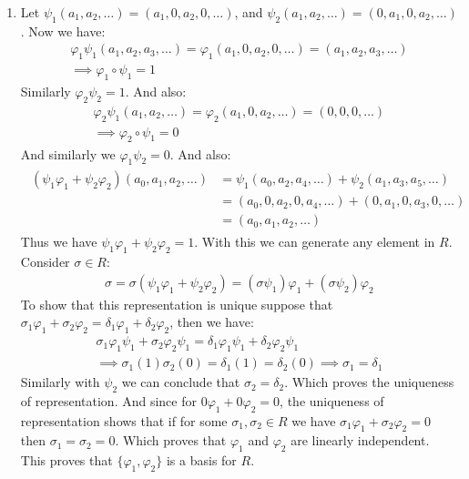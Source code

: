 \begin{enumerate}[label=\ilabel]
    \item 
        Let $\psi_1(a_1, a_2, \dots) = (a_1, 0, a_2, 0, \dots)$, and $\psi_2(a_1, a_2, \dots) = (0, a_1, 0, a_2, \dots)$. Now we have:
        \begin{gather*}
            \varphi_1 \psi_1 (a_1, a_2, a_3, \dots) = \varphi_1(a_1, 0, a_2, 0, \dots) = (a_1, a_2, a_3, \dots) \\
            \implies \varphi_1 \circ \psi_1 = 1
        \end{gather*}
        Similarly $\varphi_2 \psi_2 = 1$. And also:
        \begin{gather*}
            \varphi_2 \psi_1(a_1, a_2, \dots) = \varphi_2(a_1, 0, a_2, \dots) = (0, 0, 0, \dots) \\
            \implies \varphi_2 \circ \psi_1 = 0
        \end{gather*}
        And similarly we $\varphi_1 \psi_2 = 0$. And also:
        \begin{gather*}
            \begin{split}
                (\psi_1 \varphi_1 + \psi_2 \varphi_2)(a_0, a_1, a_2, \dots) & = \psi_1(a_0, a_2, a_4, \dots) + \psi_2(a_1, a_3, a_5, \dots) \\
                & = (a_0, 0, a_2, 0, a_4, \dots) + (0, a_1, 0, a_3, 0, \dots) \\
                & = (a_0, a_1, a_2, \dots)
            \end{split}
        \end{gather*}
        Thus we have $\psi_1 \varphi_1 + \psi_2 \varphi_2 = 1$.
        With this we can generate any element in $R$. Consider $\sigma \in R$:
        \begin{gather*}
            \sigma = \sigma(\psi_1 \varphi_1 + \psi_2 \varphi_2) = (\sigma \psi_1) \varphi_1 + (\sigma \psi_2) \varphi_2
        \end{gather*}
        To show that this representation is unique suppose that $\sigma_1 \varphi_1 + \sigma_2 \varphi_2 = \delta_1 \varphi_1 + \delta_2 \varphi_2$, then we have:
        \begin{gather*}
            \sigma_1 \varphi_1 \psi_1 + \sigma_2 \varphi_2 \psi_1 = \delta_1 \varphi_1 \psi_1 + \delta_2 \varphi_2 \psi_1 \\
            \implies \sigma_1 (1) \sigma_2 (0) = \delta_1 (1) = \delta_2(0) \implies \sigma_1 = \delta_1
        \end{gather*}
        Similarly with $\psi_2$ we can conclude that $\sigma_2 = \delta_2$. Which proves the uniqueness of representation. And since for $0 \varphi_1 + 0 \varphi_2 = 0$, the uniqueness of representation shows that if for some $\sigma_1, \sigma_2 \in R$ we have $\sigma_1 \varphi_1 + \sigma_2 \varphi_2 = 0$ then $\sigma_1 = \sigma_2 = 0$. Which proves that $\varphi_1$ and $\varphi_2$ are linearly independent. This proves that $\{\varphi_1, \varphi_2\}$ is a basis for $R$.

\end{enumerate}

